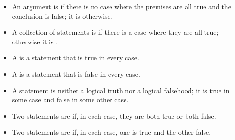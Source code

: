 \documentclass[PHIL101-Textbook.tex]{subfiles}
\begin{document}
\begin{itemize}
\item An argument is  if there is no case where the premises are all true and the conclusion is false; it is  otherwise.

\item A collection of statements is  if there is a case where they are all true; otherwise it is .

\item A  is a statement that is true in every case.

\item A  is a statement that is false in every case.

\item A  statement is neither a logical truth nor a logical falsehood; it is true in some case and false in some other case.

\item Two statements are  if, in each case, they are both true or both false.

\item Two statements are  if, in each case, one is true and the other false.

\end{itemize}



\pagebreak
\practiceproblems
\end{document}
